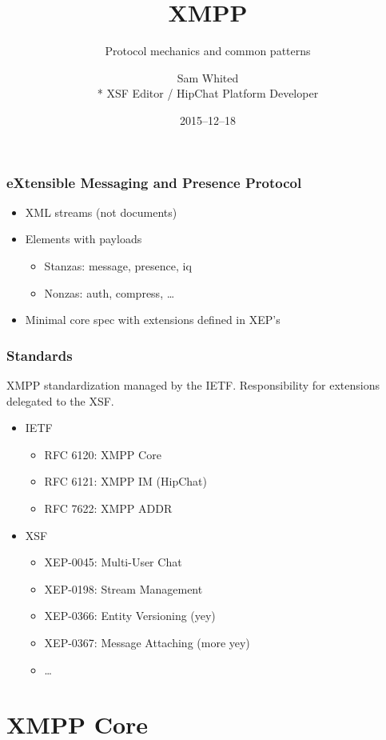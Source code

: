 \documentclass[xelatex]{beamer}
\title[]{XMPP}
\subtitle{Protocol mechanics and common patterns}
\author[]{%
	Sam Whited\\*%
	{\tiny XSF Editor / HipChat Platform Developer%
}}
\date{2015--12--18}
\begin{document}
	\begin{frame}
		\maketitle
	\end{frame}

	\begin{frame}
		\frametitle{eXtensible Messaging and Presence Protocol}
		\begin{itemize}
			\item XML streams (not documents)
			\item Elements with payloads
				\begin{itemize}
					\item Stanzas: message, presence, iq
					\item Nonzas: auth, compress, \ldots
				\end{itemize}
			\item Minimal core spec with extensions defined in XEP's
		\end{itemize}
	\end{frame}

	\begin{frame}
		\frametitle{Standards}
		XMPP standardization managed by the IETF. Responsibility for extensions
		delegated to the XSF.
		\begin{itemize}
			\item IETF
			\begin{itemize}
			\item RFC 6120: XMPP Core
			\item RFC 6121: XMPP IM (HipChat)
			\item RFC 7622: XMPP ADDR
			\end{itemize}
		\item XSF
			\begin{itemize}
			\item XEP-0045: Multi-User Chat
			\item XEP-0198: Stream Management
			\item XEP-0366: Entity Versioning (yey)
			\item XEP-0367: Message Attaching (more yey)
			\item \ldots
			\end{itemize}
		\end{itemize}
	\end{frame}

	\section[]{XMPP Core}
	\frame{\sectionpage}
\end{document}
